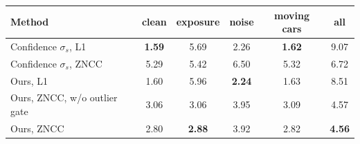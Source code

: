 \begin{tabular}{l ccccc}
\toprule
Method & clean & exposure & noise & moving cars & all \\
\midrule
Confidence $\sigma_s$, L1 & \textbf{1.59} & 5.69 & 2.26 & \textbf{1.62} & 9.07 \\
Confidence $\sigma_s$, ZNCC & 5.29 & 5.42 & 6.50 & 5.32 & 6.72 \\
Ours, L1 & 1.60 & 5.96 & \textbf{2.24} & 1.63 & 8.51 \\
Ours, ZNCC, w/o outlier gate & 3.06 & 3.06 & 3.95 & 3.09 & 4.57 \\
Ours, ZNCC & 2.80 & \textbf{2.88} & 3.92 & 2.82 & \textbf{4.56} \\
\bottomrule
\end{tabular}